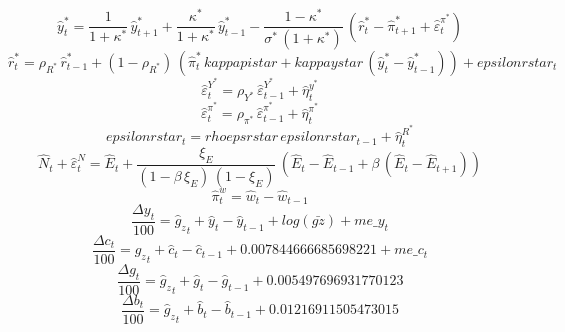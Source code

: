 \begin{dmath}
{\hat{y}^*_{t}}=\frac{1}{1+{\kappa^*}}\, {\hat{y}^*_{t+1}}+\frac{{\kappa^*}}{1+{\kappa^*}}\, {\hat{y}^*_{t-1}}-\frac{1-{\kappa^*}}{{\sigma^*}\, \left(1+{\kappa^*}\right)}\, \left({\hat{r}^*_{t}}-{\hat{\pi}^*_{t+1}}+{\hat{\varepsilon}^{\pi^*}_{t}}\right)
\end{dmath}
\begin{dmath}
{\hat{r}^*_{t}}={{\rho_{R^*}}}\, {\hat{r}^*_{t-1}}+\left(1-{{\rho_{R^*}}}\right)\, \left({\hat{\pi}^*_{t}}\, {kappapistar}+{kappaystar}\, \left({\hat{y}^*_{t}}-{\hat{y}^*_{t-1}}\right)\right)+{epsilonrstar_{t}}
\end{dmath}
\begin{dmath}
{\hat{\varepsilon}^{Y^*}_{t}}={{\rho_{Y^*}}}\, {\hat{\varepsilon}^{Y^*}_{t-1}}+{\hat{\eta}^{y^*}_{t}}
\end{dmath}
\begin{dmath}
{\hat{\varepsilon}^{\pi^*}_{t}}={{\rho_{\pi^*}}}\, {\hat{\varepsilon}^{\pi^*}_{t-1}}+{\hat{\eta}^{\pi^*}_{t}}
\end{dmath}
\begin{dmath}
{epsilonrstar_{t}}={rhoepsrstar}\, {epsilonrstar_{t-1}}+{\hat{\eta}^{R^*}_{t}}
\end{dmath}
\begin{dmath}
{\hat{N}_{t}}+{\hat{\varepsilon}^N_{t}}={\hat{E}_{t}}+\frac{{\xi_E}}{\left(1-{\beta}\, {\xi_E}\right)\, \left(1-{\xi_E}\right)}\, \left({\hat{E}_{t}}-{\hat{E}_{t-1}}+{\beta}\, \left({\hat{E}_{t}}-{\hat{E}_{t+1}}\right)\right)
\end{dmath}
\begin{dmath}
{\hat{\pi}^w_{t}}={\hat{w}_{t}}-{\hat{w}_{t-1}}
\end{dmath}
\begin{dmath}
\frac{{\Delta{y}_{t}}}{100}={{\hat{g}_z}_{t}}+{\hat{y}_{t}}-{\hat{y}_{t-1}}+log\left({\bar{gz}}\right)+{me\_y_{t}}
\end{dmath}
\begin{dmath}
\frac{{\Delta{c}_{t}}}{100}={{\hat{g}_z}_{t}}+{\hat{c}_{t}}-{\hat{c}_{t-1}}+0.007844666685698221+{me\_c_{t}}
\end{dmath}
\begin{dmath}
\frac{{\Delta{g}_{t}}}{100}={{\hat{g}_z}_{t}}+{\hat{g}_{t}}-{\hat{g}_{t-1}}+0.005497696931770123
\end{dmath}
\begin{dmath}
\frac{{\Delta{b}_{t}}}{100}={{\hat{g}_z}_{t}}+{\hat{b}_{t}}-{\hat{b}_{t-1}}+0.01216911505473015
\end{dmath}
